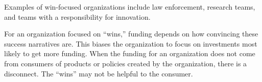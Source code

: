 Examples of win-focused organizations include law enforcement, research teams, and teams with a responsibility for innovation. 

For an organization focused on ``wins,'' funding depends on how convincing these success narratives are. This biases the organization to focus on investments most likely to get more funding. When the funding for an organization does not come from consumers of products or policies created by the organization, there is a disconnect. The ``wins'' may not be helpful to the consumer.


